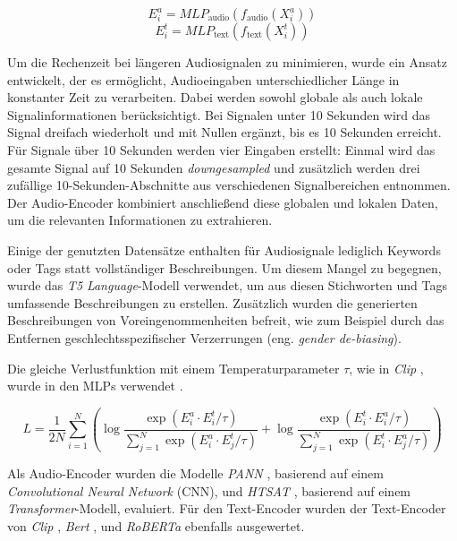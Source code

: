 \documentclass[
  a4paper,  %
  twoside,  %
  bibliography=totoc,
  headsepline,
  cleardoublepage=empty,
  parskip=half,
  draft=false
]{scrbook}
\begin{document}
\begin{equation}
     E_i^a = M L P_{\text{audio}}\left(f_{\text{audio}}\left(X_i^a\right)\right)
\end{equation}
\begin{equation}
    E_i^t = M L P_{\text{text}}\left(f_{\text{text}}\left(X_i^t\right)\right)
\end{equation}

Um die Rechenzeit bei längeren Audiosignalen zu minimieren, wurde ein Ansatz entwickelt, der es ermöglicht, Audioeingaben unterschiedlicher Länge in konstanter Zeit zu verarbeiten. Dabei werden sowohl globale als auch lokale Signalinformationen berücksichtigt. Bei Signalen unter 10 Sekunden wird das Signal dreifach wiederholt und mit Nullen ergänzt, bis es 10 Sekunden erreicht. Für Signale über 10 Sekunden werden vier Eingaben erstellt: Einmal wird das gesamte Signal auf 10 Sekunden \emph{downgesampled} und zusätzlich werden drei zufällige 10-Sekunden-Abschnitte aus verschiedenen Signalbereichen entnommen. Der Audio-Encoder kombiniert anschließend diese globalen und lokalen Daten, um die relevanten Informationen zu extrahieren. \cite{wu_large-scale_2023}

Einige der genutzten Datensätze enthalten für Audiosignale lediglich Keywords oder Tags statt vollständiger Beschreibungen. Um diesem Mangel zu begegnen, wurde das \emph{T5} \cite{raffel_exploring_2020} \emph{Language}-Modell verwendet, um aus diesen Stichworten und Tags umfassende Beschreibungen zu erstellen. Zusätzlich wurden die generierten Beschreibungen von Voreingenommenheiten befreit, wie zum Beispiel durch das Entfernen geschlechtsspezifischer Verzerrungen (eng. \emph{gender de-biasing}). \cite{wu_large-scale_2023}

Die gleiche Verlustfunktion mit einem Temperaturparameter $\tau$, wie in \emph{Clip} \cite{radford_learning_2021}, wurde in den MLPs verwendet \cite{wu_large-scale_2023}.

\begin{equation}
L=\frac{1}{2 N} \sum_{i=1}^N\left(\log \frac{\exp \left(E_i^a \cdot E_i^t / \tau\right)}{\sum_{j=1}^N \exp \left(E_i^a \cdot E_j^t / \tau\right)}+\log \frac{\exp \left(E_i^t \cdot E_i^a / \tau\right)}{\sum_{j=1}^N \exp \left(E_i^t \cdot E_j^a / \tau\right)}\right)
\end{equation}

Als Audio-Encoder wurden die Modelle \emph{PANN} \cite{kong_panns_2020}, basierend auf einem \emph{Convolutional Neural Network} (CNN), und \emph{HTSAT} \cite{chen_hts-at_2022}, basierend auf einem \emph{Transformer}-Modell, evaluiert. Für den Text-Encoder wurden der Text-Encoder von \emph{Clip} \cite{radford_learning_2021}, \emph{Bert} \cite{devlin_bert_2019}, und \emph{RoBERTa} \cite{liu_roberta_2019} ebenfalls ausgewertet. \cite{wu_large-scale_2023}
\end{document}
